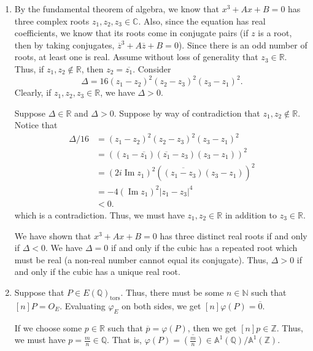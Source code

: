 \documentclass[12 pt, letterpaper]{hmcpset}
\begin{document}
\begin{solution}
	\begin{enumerate}
		\item By the fundamental theorem of algebra, we know that $x^{3} + A x + B = 0$ has three complex roots $z_{1}, z_{2}, z_{3} \in \mathbb{C}$. Also, since the equation has real coefficients, we know that its roots come in conjugate pairs (if $z$ is a root, then by taking conjugates, $\overline{z}^{3} + A \overline{z} + B = 0$). Since there is an odd number of roots, at least one is real. Assume without loss of generality that $z_3 \in \mathbb{R}$. Thus, if $z_{1}, z_{2} \notin \mathbb{R}$, then $z_{2} = \overline{z_{1}}$.
			Consider
			\[
				\Delta = 16 (z_{1} - z_{2})^{2} (z_{2} - z_{3})^{2} (z_{3} - z_{1})^{2}.
			\]
			Clearly, if $z_{1}, z_{2}, z_{3} \in \mathbb{R}$, we have $\Delta > 0$.

			Suppose $\Delta \in \mathbb{R}$ and $\Delta > 0$. Suppose by way of contradiction that $z_{1}, z_{2} \notin \mathbb{R}$. Notice that 
			\[
				\begin{split}
					\Delta/16 & = (z_{1} - z_{2})^{2}(z_{2} - z_{3})^{2}(z_{3} - z_{1})^{2} \\
						  & = ((z_{1} - \overline{z_{1}})(\overline{z_{1}} - z_{3})(z_{3} - z_{1}))^{2} \\
						  & = (2 i \operatorname{Im} z_{1})^{2} (\overline{(z_{1} - z_{3})} (z_{3} - z_{1}))^{2} \\
						  & = -4 (\operatorname{Im} z_{1})^{2} \lvert z_{1} - z_{3} \rvert^{4} \\
						  & < 0.
				\end{split}
			\]
			which is a contradiction. Thus, we must have $z_{1}, z_{2} \in \mathbb{R}$ in addition to $z_{3} \in \mathbb{R}$.

			We have shown that $x^{3} + Ax + B = 0$ has three distinct real roots if and only if $\Delta < 0$. We have $\Delta = 0$ if and only if the cubic has a repeated root which must be real (a non-real number cannot equal its conjugate). Thus, $\Delta > 0$ if and only if the cubic has a unique real root.
		\item Suppose that $P \in E(\mathbb{Q})_{\text{tors}}$. Thus, there must be some $n \in \mathbb{N}$ such that $[n] P = O_{E}$. Evaluating $\varphi_{E}$ on both sides, we get $[n] \varphi(P) = \overline{0}$. 

			If we choose some $p \in \mathbb{R}$ such that $\overline{p} = \varphi(P)$, then we get $[n] p \in \mathbb{Z}$. Thus, we must have $p = \frac{m}{n} \in \mathbb{Q}$. That is, $\varphi(P) = \overline{\left ( \frac{m}{n} \right )} \in \mathbb{A}^{1}(\mathbb{Q}) / \mathbb{A}^{1}(\mathbb{Z})$.


\end{enumerate}
\end{solution}
\end{document}
